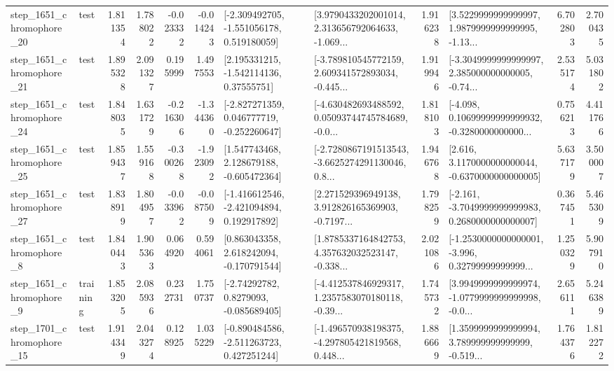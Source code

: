 \begin{tabular}{llrrrrllrlrr}
 step\_1651\_chromophore\_20 &      test &      1.811354 &    1.788022 &     -0.023332 & -0.014243 &   [-2.309492705, -1.551056178, 0.519180059] &  [3.9790433202001014, 2.313656792064633, -1.069... &       1.916238 &  [3.5229999999999997, 1.9879999999999995, -1.13... &            6.702803 &          2.700435 \\
 step\_1651\_chromophore\_21 &      test &      1.895328 &    2.091327 &      0.195999 &  1.497553 &     [2.195331215, -1.542114136, 0.37555751] &  [-3.789810545772159, 2.609341572893034, -0.445... &       1.919946 &  [-3.3049999999999997, 2.385000000000005, -0.74... &            2.535174 &          5.031802 \\
 step\_1651\_chromophore\_24 &      test &      1.848035 &    1.631729 &     -0.216306 & -1.344360 &   [-2.827271359, 0.046777719, -0.252260647] &  [-4.630482693488592, 0.05093744745784689, -0.0... &       1.818103 &  [-4.098, 0.10699999999999932, -0.3280000000000... &            0.756213 &          4.411766 \\
 step\_1651\_chromophore\_25 &      test &      1.859437 &    1.559168 &     -0.300268 & -1.923092 &    [1.547743468, 2.128679188, -0.605472364] &  [-2.7280867191513543, -3.6625274291130046, 0.8... &       1.946768 &   [2.616, 3.1170000000000044, -0.6370000000000005] &            5.637179 &          3.500007 \\
 step\_1651\_chromophore\_27 &      test &      1.838919 &    1.804957 &     -0.033962 & -0.087509 &   [-1.416612546, -2.421094894, 0.192917892] &  [2.271529396949138, 3.912826165369903, -0.7197... &       1.798259 &  [-2.161, -3.7049999999999983, 0.2680000000000007] &            0.367451 &          5.465309 \\
  step\_1651\_chromophore\_8 &      test &      1.840443 &    1.905363 &      0.064920 &  0.594061 &    [0.863043358, 2.618242094, -0.170791544] &  [1.8785337164842753, 4.357632032523147, -0.338... &       2.021086 &  [-1.2530000000000001, -3.996, 0.32799999999999... &            1.250329 &          5.907910 \\
  step\_1651\_chromophore\_9 &  training &      1.853205 &    2.085936 &      0.232731 &  1.750737 &      [-2.74292782, 0.8279093, -0.085689405] &  [-4.412537846929317, 1.2357583070180118, -0.39... &       1.745732 &  [3.9949999999999974, -1.0779999999999998, -0.0... &            2.656111 &          5.246389 \\
 step\_1701\_chromophore\_15 &      test &      1.914349 &    2.043274 &      0.128925 &  1.035229 &   [-0.890484586, -2.511263723, 0.427251244] &  [-1.496570938198375, -4.297805421819568, 0.448... &       1.886669 &  [1.3599999999999994, 3.789999999999999, -0.519... &            1.764376 &          1.812272 \\

\end{tabular}
